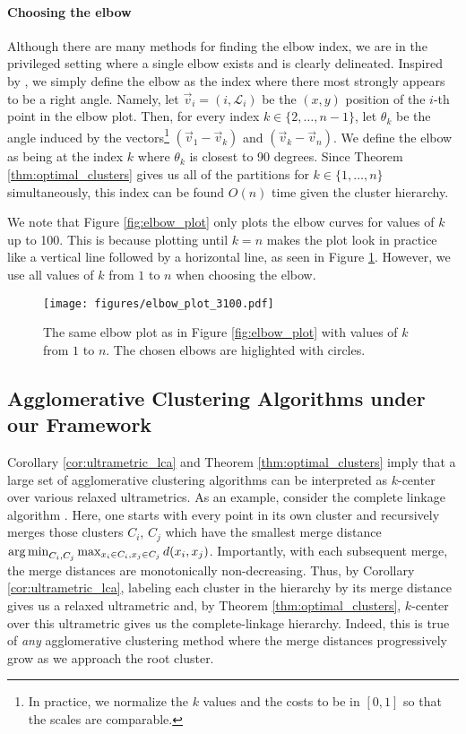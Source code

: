 \paragraph{Choosing the elbow}
Although there are many methods for finding the elbow index, we are in the privileged setting where a single elbow exists and is clearly delineated. Inspired by \citet{elbow_angle}, we simply define the elbow as the index where there most strongly appears to be a right angle. Namely, let $\vec{v}_i = (i, \mathcal{L}_i)$ be the $(x, y)$ position of the $i$-th point in the elbow plot. Then, for every index $k \in \{2, \ldots, n-1\}$, let $\theta_k$ be the angle induced by the vectors\footnote{In practice, we normalize the $k$ values and the costs to be in $[0, 1]$ so that the scales are comparable.} $(\vec{v}_1 - \vec{v}_k)$ and $(\vec{v}_k - \vec{v}_n)$. We define the elbow as being at the index $k$ where $\theta_k$ is closest to 90 degrees. Since Theorem \ref{thm:optimal_clusters} gives us all of the partitions for $k \in \{1, \ldots, n\}$ simultaneously, this index can be found $O(n)$ time given the cluster hierarchy.

We note that Figure \ref{fig:elbow_plot} only plots the elbow curves for values of $k$ up to 100. This is because plotting until $k=n$ makes the plot look in practice like a vertical line followed by a horizontal line, as seen in Figure \ref{fig:elbow_plot_until_n}. However, we use all values of $k$ from $1$ to $n$ when choosing the elbow.

\begin{figure}
    \centering
    \texttt{[image: figures/elbow\_plot\_3100.pdf]}
    \caption{The same elbow plot as in Figure \ref{fig:elbow_plot} with values of $k$ from $1$ to $n$. The chosen elbows are higlighted with circles.}
    \label{fig:elbow_plot_until_n}
\end{figure}

\subsection{Agglomerative Clustering Algorithms under our Framework}

Corollary \ref{cor:ultrametric_lca} and Theorem \ref{thm:optimal_clusters} imply that a large set of agglomerative clustering algorithms can be interpreted as $k$-center over various relaxed ultrametrics. As an example, consider the complete linkage algorithm \citep{agglomerative_clusterings}. Here, one starts with every point in its own cluster and recursively merges those clusters $C_i$, $C_j$ which have the smallest merge distance $\operatorname*{arg\,min}_{C_i, C_j} \max_{x_i \in C_i, x_j \in C_j} d(x_i, x_j)$. Importantly, with each subsequent merge, the merge distances are monotonically non-decreasing. Thus, by Corollary \ref{cor:ultrametric_lca}, labeling each cluster in the hierarchy by its merge distance gives us a relaxed ultrametric and, by Theorem \ref{thm:optimal_clusters}, $k$-center over this ultrametric gives us the complete-linkage hierarchy. Indeed, this is true of \emph{any} agglomerative clustering method where the merge distances progressively grow as we approach the root cluster.

